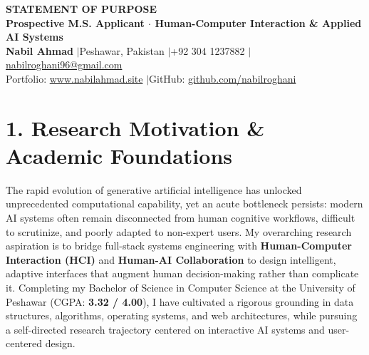 \documentclass[10pt,a4paper]{article}
\begin{document}
\pagestyle{empty}

\begin{center}
    {\large \textbf{STATEMENT OF PURPOSE}} \\[2pt]
    \textbf{Prospective M.S. Applicant $\cdot$ Human-Computer Interaction \& Applied AI Systems} \\[2pt]
    \small \textbf{Nabil Ahmad} \quad$|$\quad Peshawar, Pakistan \quad$|$\quad +92 304 1237882 \quad$|$\quad \href{mailto:nabilroghani96@gmail.com}{nabilroghani96@gmail.com} \\[1pt]
    Portfolio: \href{https://www.nabilahmad.site}{www.nabilahmad.site} \quad$|$\quad GitHub: \href{https://github.com/nabilroghani}{github.com/nabilroghani}
\end{center}
\vspace{-4pt}

\section{1. Research Motivation \& Academic Foundations}
The rapid evolution of generative artificial intelligence has unlocked unprecedented computational capability, yet an acute bottleneck persists: modern AI systems often remain disconnected from human cognitive workflows, difficult to scrutinize, and poorly adapted to non-expert users. My overarching research aspiration is to bridge full-stack systems engineering with \textbf{Human-Computer Interaction (HCI)} and \textbf{Human-AI Collaboration} to design intelligent, adaptive interfaces that augment human decision-making rather than complicate it. Completing my Bachelor of Science in Computer Science at the University of Peshawar (CGPA: \textbf{3.32 / 4.00}), I have cultivated a rigorous grounding in data structures, algorithms, operating systems, and web architectures, while pursuing a self-directed research trajectory centered on interactive AI systems and user-centered design.

\end{document}
